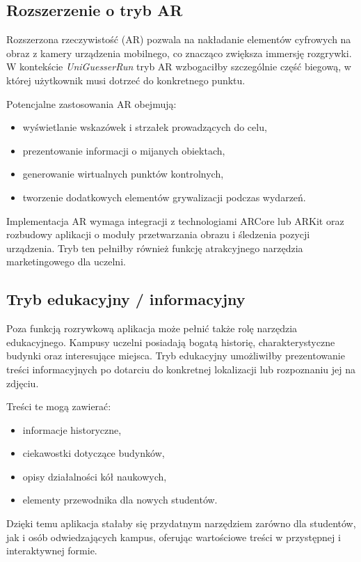\subsection{Rozszerzenie o tryb AR}

Rozszerzona rzeczywistość (AR) pozwala na nakładanie elementów cyfrowych na obraz z kamery urządzenia mobilnego, co znacząco zwiększa immersję rozgrywki. W kontekście \textit{UniGuesserRun} tryb AR wzbogaciłby szczególnie część biegową, w której użytkownik musi dotrzeć do konkretnego punktu.

Potencjalne zastosowania AR obejmują:
\begin{itemize}
    \item wyświetlanie wskazówek i strzałek prowadzących do celu,
    \item prezentowanie informacji o mijanych obiektach,
    \item generowanie wirtualnych punktów kontrolnych,
    \item tworzenie dodatkowych elementów grywalizacji podczas wydarzeń.
\end{itemize}

Implementacja AR wymaga integracji z technologiami ARCore lub ARKit oraz rozbudowy aplikacji o moduły przetwarzania obrazu i śledzenia pozycji urządzenia. Tryb ten pełniłby również funkcję atrakcyjnego narzędzia marketingowego dla uczelni.

\subsection{Tryb edukacyjny / informacyjny}

Poza funkcją rozrywkową aplikacja może pełnić także rolę narzędzia edukacyjnego. Kampusy uczelni posiadają bogatą historię, charakterystyczne budynki oraz interesujące miejsca. Tryb edukacyjny umożliwiłby prezentowanie treści informacyjnych po dotarciu do konkretnej lokalizacji lub rozpoznaniu jej na zdjęciu.

Treści te mogą zawierać:
\begin{itemize}
    \item informacje historyczne,
    \item ciekawostki dotyczące budynków,
    \item opisy działalności kół naukowych,
    \item elementy przewodnika dla nowych studentów.
\end{itemize}

Dzięki temu aplikacja stałaby się przydatnym narzędziem zarówno dla studentów, jak i osób odwiedzających kampus, oferując wartościowe treści w przystępnej i interaktywnej formie.

